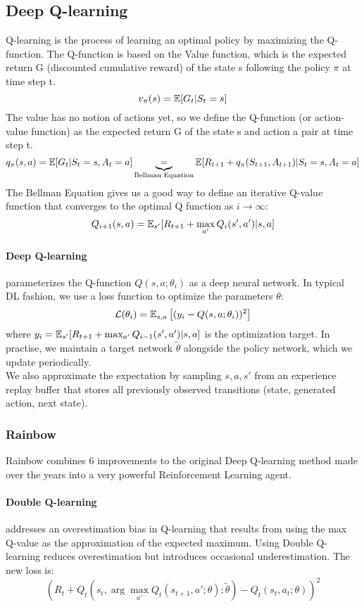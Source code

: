 \subsection{Deep Q-learning}
Q-learning is the process of learning an optimal policy by maximizing the Q-function.
The Q-function is based on the Value function, which is the expected return G (discounted cumulative reward) of the state s following the policy $\pi$ at time step t.
$$v_\pi(s) = \mathbb{E}[G_t| S_t=s]$$
The value has no notion of actions yet, so we define the Q-function (or action-value function) as the expected return G of the state s and action a pair at time step t.
$$q_\pi(s,a) = \mathbb{E}[G_t|S_t=s, A_t = a] \underbrace{=}_{\text{Bellman Equation}} \mathbb{E}[R_{t+1} + q_\pi(S_{t+1}, A_{t+1})|S_t=s, A_t = a]$$
The Bellman Equation gives us a good way to define an iterative Q-value function that converges to the optimal Q function as $i\rightarrow \infty$:
$$Q_{i+1}(s,a) = \mathbb{E}_{s'}[R_{t+1} + \max_{a'} Q_{i}(s', a')|s,a]$$
\paragraph{Deep Q-learning} \cite{deep-q} parameterizes the Q-function $Q(s,a;\theta_i)$ as a deep neural network. In typical DL fashion, we use a loss function to optimize the parameters $\theta$:
$$\mathcal{L}(\theta_i) = \mathbb{E}_{s,a}\left[(y_i - Q(s,a;\theta_i))^2\right]$$ where 
$y_i = \mathbb{E}_{s'}[R_{t+1} + \max_{a'} Q_{i-1}(s', a')|s,a]$ is the optimization target. 
In practise, we maintain a target network $\tilde\theta$ alongside the policy network, which we update periodically.\\
We also approximate the expectation by sampling $s,a,s'$ from an experience replay buffer that stores all previously observed transitions (state, generated action, next state).

\subsubsection{Rainbow}
Rainbow \cite{Rainbow} combines 6 improvements to the original Deep Q-learning method made over the years into a very powerful Reinforcement Learning agent.\\
\paragraph{Double Q-learning} \cite{doubleQ} addresses an overestimation bias in Q-learning that results from using the max Q-value as the approximation of the expected maximum.
Using Double Q-learning reduces overestimation but introduces occasional underestimation.
The new loss is:
$$(R_t + Q_t(s_t, \arg\max_{a'}Q_t(s_{t+1},a';\theta);\tilde\theta)  - Q_t(s_t,a_t;\theta))^2 $$
